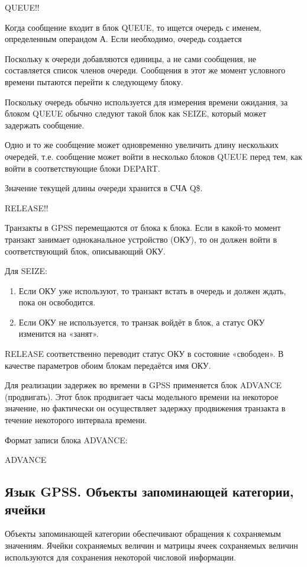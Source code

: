 \documentclass[14pt]{extarticle}
\begin{document}
QUEUE!!

Когда сообщение входит в блок QUEUE, то ищется очередь с именем, определенным операндом А. Если необходимо, очередь создается

Поскольку к очереди добавляются единицы, а не сами сообщения, не составляется список членов очереди. Сообщения в этот же момент условного времени пытаются перейти к следующему блоку.

Поскольку очередь обычно используется для измерения времени ожидания, за блоком QUEUE обычно следуют такой блок как SEIZE, который может задержать сообщение.

Одно и то же сообщение может одновременно увеличить длину нескольких очередей, т.е. сообщение может войти в несколько блоков QUEUE перед тем, как войти в соответствующие блоки DEPART.

Значение текущей длины очереди хранится в СЧА Q\$<имя очереди>.

RELEASE!!

Транзакты в GPSS перемещаются от блока к блока. Если в какой-то момент транзакт занимает одноканальное устройство (ОКУ), то он должен войти в соответствующий блок, описывающий ОКУ.

Для SEIZE:

\begin{enumerate}
	\item Если ОКУ уже используют, то транзакт встать в очередь и должен ждать, пока он освободится.
	\item Если ОКУ не используется, то транзак войдёт в блок, а статус ОКУ изменится на «занят».
\end{enumerate}

RELEASE соответственно переводит статус ОКУ в состояние «свободен». В качестве параметров обоим блокам передаётся имя ОКУ.

Для реализации задержек во времени в GPSS применяется блок ADVANCE (продвигать). Этот блок продвигает часы модельного времени на некоторое значение, но фактически он осуществляет задержку продвижения транзакта в течение некоторого интервала времени.

Формат записи блока ADVANCE:

ADVANCE

\subsection*{Язык GPSS. Объекты запоминающей категории, ячейки}

Объекты запоминающей категории обеспечивают обращения к сохраняемым значениям. Ячейки сохраняемых величин и матрицы ячеек сохраняемых величин используются для сохранения некоторой числовой информации.
\end{document}
